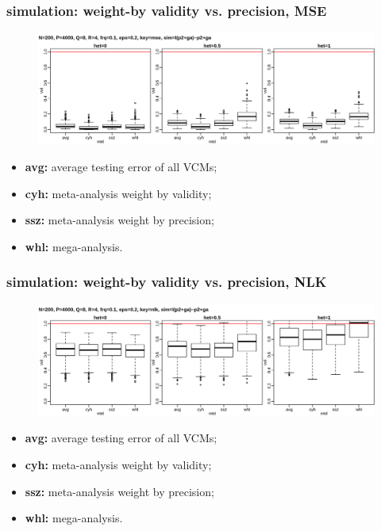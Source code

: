 \documentclass{beamer}
\begin{document}
\begin{frame}%
  \frametitle{simulation: weight-by validity vs. precision, MSE} %
  \begin{figure}
    \centering \includegraphics[width=1.0\linewidth]{img/met_mnq_cyh_mse}
  \end{figure}
  \textbf{\color{blue}{inner plot: strategies, from left to right:}}
  \begin{itemize}
  \item \textbf{avg:} average testing error of all VCMs;
  \item \textbf{cyh:} meta-analysis weight by validity;
  \item \textbf{ssz:} meta-analysis weight by precision;
  \item \textbf{whl:} mega-analysis.
  \end{itemize}
\end{frame}
\begin{frame}%
  \frametitle{simulation: weight-by validity vs. precision, NLK} %
  \begin{figure}
    \centering \includegraphics[width=1.0\linewidth]{img/met_mnq_cyh_nlk}
  \end{figure}
  \textbf{\color{blue}{inner plot: strategies, from left to right:}}
  \begin{itemize}
  \item \textbf{avg:} average testing error of all VCMs;
  \item \textbf{cyh:} meta-analysis weight by validity;
  \item \textbf{ssz:} meta-analysis weight by precision;
  \item \textbf{whl:} mega-analysis.
  \end{itemize}
\end{frame}
\end{document}
